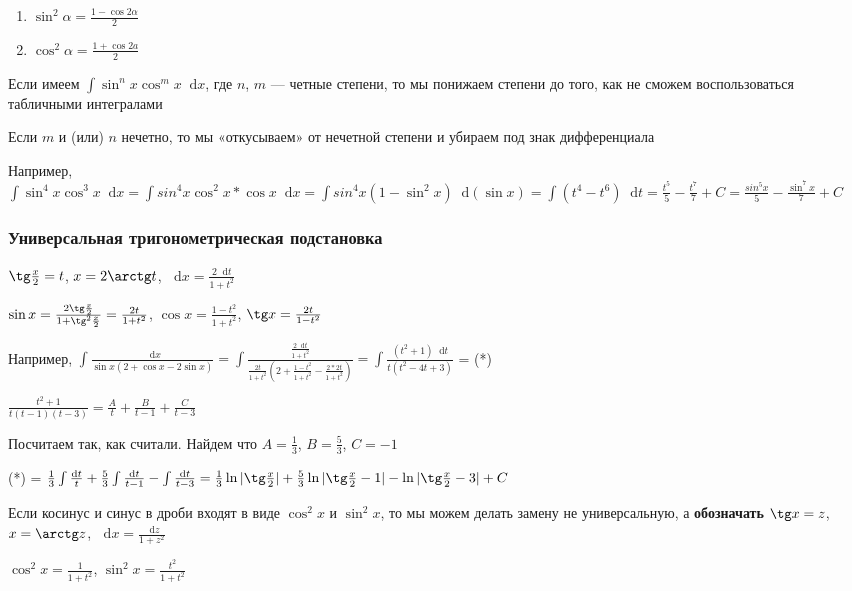 \documentclass{article}
\newcommand*\diff{\mathop{}\!\mathrm{d}}
\begin{document}
\begin{enumerate}
    \item $\sin^2 \alpha = \frac{1 - \cos 2 \alpha}{2}$
    \item $\cos^2 \alpha = \frac{1 + \cos 2 a}{2}$
\end{enumerate}

Если имеем $\int \sin^{n} x \cos^{m} x \diff x$, где $n$, $m$ — четные степени, то мы понижаем степени до того, как не сможем воспользоваться табличными интегралами

\hfill

Если $m$ и (или) $n$ нечетно, то мы «откусываем» от нечетной степени и убираем под знак дифференциала

Например, $\int \sin^4 x \cos^3 x \diff x = \int sin^4 x \cos^2 x * \cos x \diff x = \int sin^4 x (1 - \sin^2 x) \diff (\sin x) = \int (t^4 - t^6) \diff t = \frac{t^5}{5} - \frac{t^7}{7} + C = \frac{sin^5 x}{5} - \frac{\sin^7 x}{7} + C$

\subsubsection{Универсальная тригонометрическая подстановка}

$\tg \frac{x}{2} = t$, $x = 2 \arctg t$, $\diff x = \frac{2 \diff t}{1 + t^2}$

$\sin x = \frac{2 \tg \frac{x}{2}}{1 + \tg^2 \frac{x}{2}} = \frac{2 t}{1 + t^2}$, $\cos x = \frac{1 - t^2}{1 + t^2}$, $\tg x = \frac{2 t}{1 - t^2}$

\hfill

Например, $\int \frac{\diff x}{\sin x (2 + \cos x - 2 \sin x)} = \int \frac{\frac{2 \diff t}{1 + t^2}}{\frac{2t}{1 + t^2} (2 + \frac{1 - t^2}{1 + t^2} - \frac{2 * 2 t}{1 + t^2})} = \int \frac{(t^2 + 1) \diff t}{t (t^2 - 4t + 3)}$ = (*)

$\frac{t^2 + 1}{t(t - 1)(t - 3)} = \frac{A}{t} + \frac{B}{t - 1} + \frac{C}{t - 3}$

Посчитаем так, как считали. Найдем что $A = \frac{1}{3}$, $B = \frac{5}{3}$, $C = -1$

(*) = $\frac{1}{3} \int \frac{\diff t}{t} + \frac{5}{3} \int \frac{\diff t}{t - 1} - \int \frac{\diff t}{t - 3} = \frac{1}{3} \ln |\tg \frac{x}{2}| + \frac{5}{3} \ln |\tg \frac{x}{2} - 1| - \ln |\tg \frac{x}{2} - 3| + C$

\hfill

Если косинус и синус в дроби входят в виде $\cos^2 x$ и $\sin^2 x$, то мы можем делать замену не универсальную, а \textbf{обозначать} $\tg x = z$, $x = \arctg z$, $\diff x = \frac{\diff z}{1 + z^2}$

$\cos^2 x = \frac{1}{1 + t^2}$, $\sin^2 x = \frac{t^2}{1 + t^2}$
\end{document}
